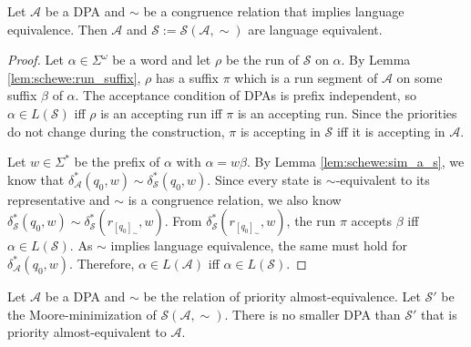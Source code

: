 \begin{lem}
	Let $\mathcal{A}$ be a DPA and $\sim$ be a congruence relation that implies language equivalence. Then $\mathcal{A}$ and $\mathcal{S} := \mathcal{S}(\mathcal{A}, \sim)$ are language equivalent.
\end{lem}

\begin{proof}
	Let $\alpha \in \Sigma^\omega$ be a word and let $\rho$ be the run of $\mathcal{S}$ on $\alpha$. By Lemma \ref{lem:schewe:run_suffix}, $\rho$ has a suffix $\pi$ which is a run segment of $\mathcal{A}$ on some suffix $\beta$ of $\alpha$. The acceptance condition of DPAs is prefix independent, so $\alpha \in L(\mathcal{S})$ iff $\rho$ is an accepting run iff $\pi$ is an accepting run. Since the priorities do not change during the construction, $\pi$ is accepting in $\mathcal{S}$ iff it is accepting in $\mathcal{A}$.
	
	Let $w \in \Sigma^*$ be the prefix of $\alpha$ with $\alpha = w \beta$. By Lemma \ref{lem:schewe:sim_a_s}, we know that $\delta^*_\mathcal{A}(q_0, w) \sim \delta^*_\mathcal{S}(q_0, w)$. Since every state is $\sim$-equivalent to its representative and $\sim$ is a congruence relation, we also know $\delta^*_\mathcal{S}(q_0, w) \sim \delta^*_\mathcal{S}(r_{[q_0]_\sim}, w)$. From $\delta^*_\mathcal{S}(r_{[q_0]_\sim}, w)$, the run $\pi$ accepts $\beta$ iff $\alpha \in L(\mathcal{S})$. As $\sim$ implies language equivalence, the same must hold for $\delta^*_\mathcal{A}(q_0, w)$. Therefore, $\alpha \in L(\mathcal{A})$ iff $\alpha \in L(\mathcal{S})$.
\end{proof}


\begin{lem}
	Let $\mathcal{A}$ be a DPA and $\sim$ be the relation of priority almost-equivalence. Let $\mathcal{S}'$ be the Moore-minimization of $\mathcal{S}(\mathcal{A}, \sim)$. There is no smaller DPA than $\mathcal{S}'$ that is priority almost-equivalent to $\mathcal{A}$.
\end{lem}

